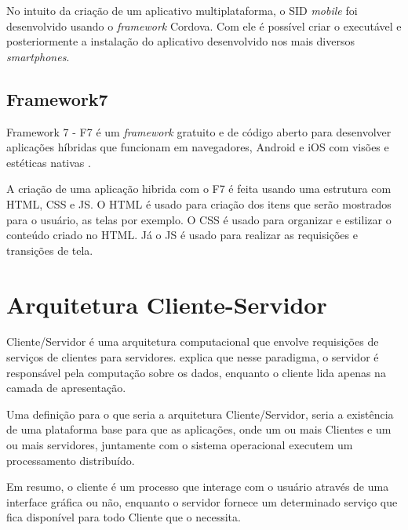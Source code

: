 No intuito da criação de um aplicativo multiplataforma, o SID \textit{mobile} foi desenvolvido usando o \textit{framework} Cordova. Com ele é possível criar o executável e posteriormente a instalação do aplicativo desenvolvido nos mais diversos \textit{smartphones}.

\subsection{Framework7}
Framework 7 - F7 é um \textit{framework} gratuito e de código aberto para desenvolver aplicações híbridas que funcionam em navegadores, Android e iOS com visões e estéticas nativas \cite{f72018}.

A criação de uma aplicação hibrida com o F7 é feita usando uma estrutura com HTML, CSS e JS. O HTML é usado para criação dos itens que serão mostrados para o usuário, as telas por exemplo. O CSS é usado para organizar e estilizar o conteúdo criado no HTML. Já o JS é usado para realizar as requisições e transições de tela.

\section{Arquitetura Cliente-Servidor}
Cliente/Servidor é uma arquitetura computacional que envolve requisições de serviços de clientes para servidores. \cite{cecin2005} explica que nesse paradigma, o servidor é responsável pela computação sobre os dados, enquanto o cliente lida apenas na camada de apresentação.

Uma definição para o que seria a arquitetura Cliente/Servidor, seria a existência de uma plataforma base para que as aplicações, onde um ou mais Clientes e um ou mais servidores, juntamente com o sistema operacional executem um processamento distribuído.

Em resumo, o cliente é um processo que interage com o usuário através de uma interface gráfica ou não, enquanto o servidor fornece um determinado serviço que fica disponível para todo Cliente que o necessita.